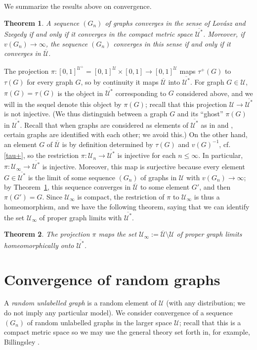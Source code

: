 \documentclass[11pt,reqno,tbtags]{amsart}
\numberwithin{equation}{section}
\newtheorem{theorem}{Theorem}[section]
\theoremstyle{definition}
\theoremstyle{remark}
\newcommand{\refT}[1]{Theorem~\ref{#1}}
\newcommand\cf{cf.\spacefactor=1000}
\newcommand\cU{{\mathcal U}}
\newcommand\qw{^{-1}}
\renewcommand{\=}{:=}
\newcommand\oi{[0,1]}
\newcommand{\Lovaszetal}{Lov\'asz and Szegedy}
\newcommand{\cux}{\cU^*}
\newcommand{\cuxq}{\overline{\cux}}
\newcommand{\cuq}{\overline{\cU}}
\newcommand{\cuu}{\cU^+}
\newcommand{\cuoo}{\cU_\infty}
\newcommand{\oiu}{\oi^{\cU}}
\newcommand{\oiuu}{\oi^{\cuu}}
\newcommand{\tauu}{\tau^+}
\begin{document}
We summarize the results above on convergence.

\begin{theorem}\label{T1}
  A sequence $(G_n)$ of graphs converges in the sense of \Lovaszetal{}
  \cite{LSz} if and only if it converges in the compact metric space
  $\cuxq$.
Moreover, if $v(G_n)\to\infty$, the sequence $(G_n)$ converges in this
  sense if and only if it converges in $\cuq$.
\end{theorem}

The projection 
$\pi:\oiuu=\oiu\times\oi\to\oiu$ maps $\tauu(G)$ to $\tau(G)$ for every
graph $G$, so by continuity it maps $\cuq$ into $\cuxq$.
For graph $G\in\cU$, $\pi(G)=\tau(G)$ is the object in $\cuxq$
corresponding to $G$ considered above, and we will in the sequel
denote this object by $\pi(G)$; recall that this projection
$\cU\to\cuxq$ is not injective. (We thus distinguish between a graph
$G$ and its ``ghost'' 
$\pi(G)$ in $\cuxq$. Recall that when graphs are
considered as elements of $\cuxq$ as in \cite{LSz} and \cite{BCL1},
certain graphs are identified with each other; we avoid this.)
On the other hand, an element $G$ of $\cuq$ is by definition
determined by $\tau(G)$ and $v(G)\qw$, 
\cf{} \eqref{tau+},
so the restriction $\pi:\cU_n\to\cuxq$ is injective for each
$n\le\infty$.
In particular, $\pi:\cuoo\to\cuxq$ is injective. Moreover,
this map is surjective because every element $G\in\cuxq$
is the limit of some sequence 
$(G_n)$ of graphs in $\cU$ with $v(G_n)\to\infty$; by \refT{T1},
this sequence converges in $\cuq$ to some element $G'$, and then $\pi(G')=G$.
Since $\cuoo$ is compact, the restriction of $\pi$ to $\cuoo$ is thus
a homeomorphism, and we have the following theorem,
saying that we can identify the set $\cuoo$ of proper graph limits with
$\cuxq$.

\begin{theorem}\label{Tcuoo}
The projection $\pi$ maps  
the set $\cuoo\=\cuq\setminus\cU$ of 
proper graph limits homeomorphically onto
$\cuxq$.
\end{theorem}




\section{Convergence of random graphs}\label{Sconv}

A \emph{random unlabelled graph} is a random element of $\cU$ (with
any distribution; we do not imply any particular model).
We consider convergence of a sequence $(G_n)$ of random unlabelled
graphs in the larger space $\cU$; recall that this is a compact metric
space so we may use the general theory set forth in, for example,
Billingsley \cite{Bill}.
\end{document}
